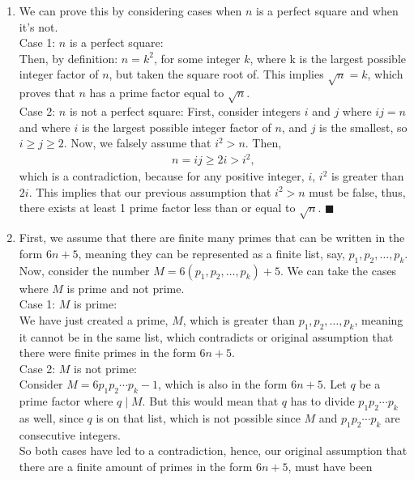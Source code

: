 \documentclass[12pt]{article}
\begin{document}
\begin{enumerate}
    \item We can prove this by considering cases when $n$ is a perfect square and when it's not.
    \\ Case 1: $n$ is a perfect square:
        \\Then, by definition: $n = k^2$, 
    for some integer $k$, where k is the largest possible integer factor of $n$,
    but taken the square root of. This implies $\sqrt{n} = k$, which proves that 
    $n$ has a prime factor equal to $\sqrt{n}$. 
    \\ Case 2: $n$ is not a perfect square:
    First, consider integers $i$ and $j$ where $ij = n$ and where $i$ is the 
    largest possible integer factor of $n$, and $j$ is the smallest, so 
    $i\geq j \geq 2$. Now, we falsely assume that $i^2 > n$. Then, 
    \begin{align*}
        n = ij \geq 2i > i^2,
    \end{align*}
    which is a contradiction, because for any positive integer, $i$, $i^2$ is 
    greater than $2i$. This implies that our previous assumption that $i^2 > n$ 
    must be false, thus, there exists at least 1 prime factor less than or 
    equal to $\sqrt{n}$. \hfill $\blacksquare$
    \item First, we assume that there are finite many primes that can be 
    written in the form $6n+5$, meaning they can be represented as a finite 
    list, say, $p_1,p_2,\ldots,p_k$. Now, consider the number $M = 6(p_1,p_2,\ldots,p_k)
    + 5$. We can take the cases where $M$ is prime and not prime. 
    \\ Case 1: $M$ is prime: 
    \\ We have just created a prime, $M$, which is greater 
    than $p_1,p_2,\ldots,p_k$, meaning it cannot be in the same list, which 
    contradicts or original assumption that there were finite primes in the form 
    $6n+5$.
    \\ Case 2: $M$ is not prime: 
    \\ Consider $M = 6p_1p_2\cdots p_k -1$, which is also in the form $6n+5$. Let 
    $q$ be a prime factor where $q \mid M$. But this would mean that $q$ has 
    to divide $p_1p_2\cdots p_k$ as well, since $q$ is on that list, which is not 
    possible since $M$ and $p_1p_2 \cdots p_k$ are consecutive integers. 
    \\ So both cases have led to a contradiction, hence, our original assumption
    that there are a finite amount of primes in the form $6n+5$, must have been 

\end{enumerate}
\end{document}

